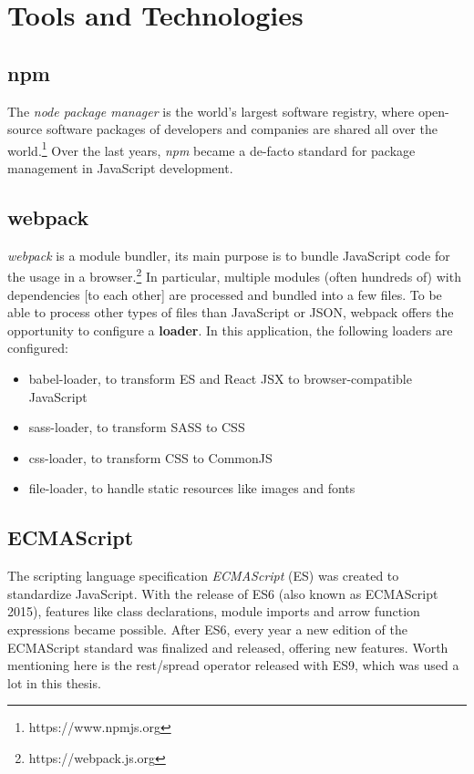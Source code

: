 \documentclass[a4paper,top=25mm,bottom=25mm,12pt,pdftex,halfparskip,twoside,bibtotoc,numbers=noenddot]{scrbook}
\begin{document}
\section{Tools and Technologies}
\subsection{npm}

The \textit{node package manager} is the world's largest software registry, where open-source software packages of developers and companies are shared all over the world.\footnote{https://www.npmjs.org} Over the last years, \textit{npm} became a de-facto standard for package management in JavaScript development.

\subsection{webpack}

\textit{webpack} is a module bundler, its main purpose is to bundle JavaScript code for the usage in a browser.\footnote{https://webpack.js.org} In particular, multiple modules (often hundreds of) with dependencies [to each other] are processed and bundled into a few files. To be able to process other types of files than JavaScript or JSON, webpack offers the opportunity to configure a \textbf{loader}. In this application, the following loaders are configured:
\begin{itemize}
\item babel-loader, to transform ES and React JSX to browser-compatible JavaScript
\item sass-loader, to transform SASS to CSS
\item css-loader, to transform CSS to CommonJS
\item file-loader, to handle static resources like images and fonts
\end{itemize}

\subsection{ECMAScript}

The scripting language specification \textit{ECMAScript} (ES) was created to standardize JavaScript. With the release of ES6 (also known as ECMAScript 2015), features like class declarations, module imports and arrow function expressions became possible. After ES6, every year a new edition of the ECMAScript standard was finalized and released, offering new features. Worth mentioning here is the rest/spread operator released with ES9, which was used a lot in this thesis.
\end{document}
